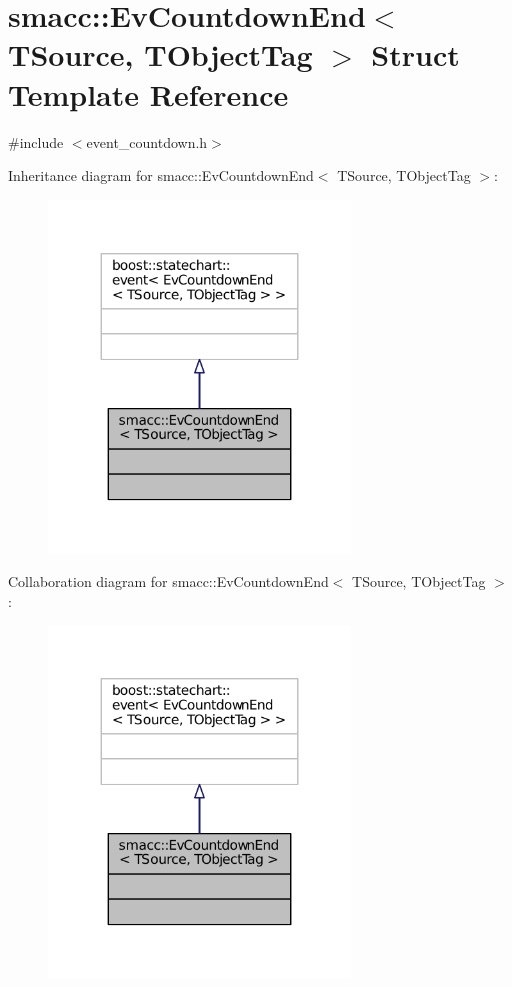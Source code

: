 \hypertarget{structsmacc_1_1EvCountdownEnd}{}\section{smacc\+:\+:Ev\+Countdown\+End$<$ T\+Source, T\+Object\+Tag $>$ Struct Template Reference}
\label{structsmacc_1_1EvCountdownEnd}


{\ttfamily \#include $<$event\+\_\+countdown.\+h$>$}



Inheritance diagram for smacc\+:\+:Ev\+Countdown\+End$<$ T\+Source, T\+Object\+Tag $>$\+:
\nopagebreak
\begin{figure}[H]
\begin{center}
\leavevmode
\includegraphics[width=227pt]{structsmacc_1_1EvCountdownEnd__inherit__graph}
\end{center}
\end{figure}


Collaboration diagram for smacc\+:\+:Ev\+Countdown\+End$<$ T\+Source, T\+Object\+Tag $>$\+:
\nopagebreak
\begin{figure}[H]
\begin{center}
\leavevmode
\includegraphics[width=227pt]{structsmacc_1_1EvCountdownEnd__coll__graph}
\end{center}
\end{figure}


